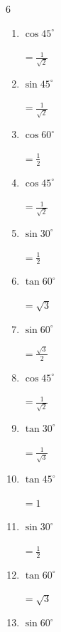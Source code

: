 \begin{multicols}{6}
\begin{enumerate}
        $\displaystyle =\frac{\sqrt{3}}{2}$

  \item $\displaystyle \cos{45^\circ}$

        $\displaystyle =\frac{1}{\sqrt{2}}$

  \item $\displaystyle \sin{45^\circ}$

        $\displaystyle =\frac{1}{\sqrt{2}}$

  \item $\displaystyle \cos{60^\circ}$

        $\displaystyle =\frac{1}{2}$

  \item $\displaystyle \cos{45^\circ}$

        $\displaystyle =\frac{1}{\sqrt{2}}$

  \item $\displaystyle \sin{30^\circ}$

        $\displaystyle =\frac{1}{2}$

  \item $\displaystyle \tan{60^\circ}$

        $\displaystyle =\sqrt{3}$

  \item $\displaystyle \sin{60^\circ}$

        $\displaystyle =\frac{\sqrt{3}}{2}$

  \item $\displaystyle \cos{45^\circ}$

        $\displaystyle =\frac{1}{\sqrt{2}}$

  \item $\displaystyle \tan{30^\circ}$

        $\displaystyle =\frac{1}{\sqrt{3}}$

  \item $\displaystyle \tan{45^\circ}$

        $\displaystyle =1$

  \item $\displaystyle \sin{30^\circ}$

        $\displaystyle =\frac{1}{2}$

  \item $\displaystyle \tan{60^\circ}$

        $\displaystyle =\sqrt{3}$

  \item $\displaystyle \sin{60^\circ}$


\end{enumerate}
\end{multicols}
